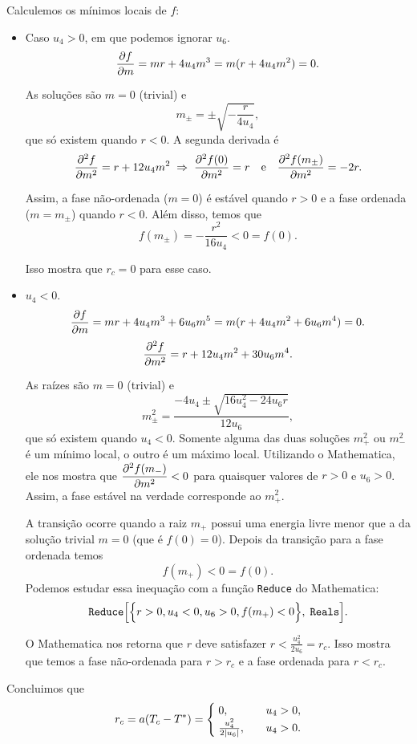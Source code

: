 \documentclass[a4paper,10pt]{article}
\begin{document}
Calculemos os mínimos locais de $f$:
\begin{itemize}
\item Caso $u_4 > 0$, em que podemos ignorar $u_6$.
$$
\pdv{f}{m} = m r + 4 u_4 m^3 = m (r + 4u_4 m^2) = 0.
$$

As soluções são $m = 0$ (trivial) e
$$
m_{\pm} = \pm\sqrt{-\frac{r}{4u_4}},
$$
que só existem quando $r < 0$. A segunda derivada é
$$
\pdv[2]{f}{m} = r + 12 u_4 m^2 \; \Rightarrow \;
\pdv[2]{f(0)}{m} = r \quad \mathrm{e} \quad \pdv[2]{f(m_{\pm})}{m} = -2r.
$$

Assim, a fase não-ordenada ($m=0$) é estável quando $r > 0$ e a fase ordenada ($m=m_\pm$) quando $r < 0$. Além disso, temos que
$$
f(m_\pm) = -\frac{r^2}{16 u_4} < 0 = f(0).
$$

Isso mostra que $r_c = 0$ para esse caso.


\item $u_4 < 0$.
$$
\pdv{f}{m} = m r + 4 u_4 m^3 + 6 u_6 m^5 = m (r + 4u_4 m^2 + 6 u_6 m^4) = 0.
$$
$$
\pdv[2]{f}{m} = r + 12 u_4 m^2 + 30 u_6 m^4.
$$

As raízes são $m = 0$ (trivial) e
$$
m_{\pm}^2 = \frac{- 4 u_4 \pm \sqrt{16 u_4^2 - 24 u_6 r}}{12 u_6},
$$
que só existem quando $u_4 < 0$. Somente alguma das duas soluções $m_+^2$ ou $m_-^2$ é um mínimo local, o outro é um máximo local. Utilizando o Mathematica, ele nos mostra que $\displaystyle{\pdv[2]{f(m_-)}{m}} < 0$ para quaisquer valores de $r > 0$ e $u_6 > 0$. Assim, a fase estável na verdade corresponde ao $m_+^2$.

\n

A transição ocorre quando a raiz $m_{+}$ possui uma energia livre menor que a da solução trivial $m = 0$ (que é $f(0) = 0$). Depois da transição para a fase ordenada temos
$$
f(m_+) < 0 = f(0).
$$
Podemos estudar essa inequação com a função \texttt{Reduce} do Mathematica:
$$
\texttt{Reduce}\qty[\Big\{r > 0, u_4 < 0, u_6 > 0, f(m_+) < 0\Big\},
\; \texttt{Reals}].
$$

O Mathematica nos retorna que $r$ deve satisfazer $r < \frac{u_4^2}{2 u_6} = r_c$. Isso mostra que temos a fase não-ordenada para $r > r_c$ e a fase ordenada para $r < r_c$.

\end{itemize}

Concluimos que
$$
r_c = a(T_c - T^*) =
\begin{cases}
\; 0, \quad & u_4 > 0, \\
\; \frac{u_4^2}{2 \abs{u_6}}, \quad & u_4 > 0.
\end{cases}
$$
\end{document}
